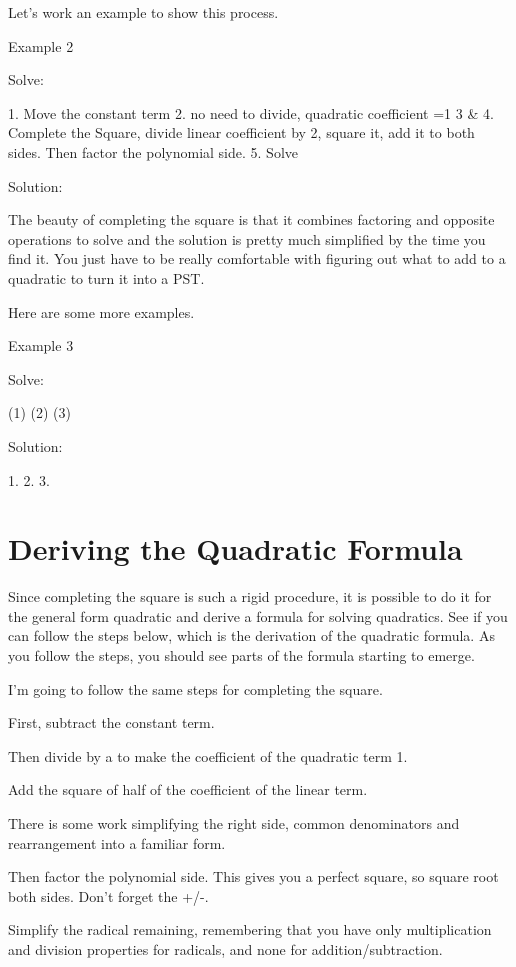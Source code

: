Let's work an example to show this process. 

Example 2

Solve: 

1. Move the constant term
2. no need to divide, quadratic coefficient =1
3 \& 4. Complete the Square, divide linear coefficient by 2, square it, add it to both sides. Then factor the polynomial side.
5. Solve

Solution:


The beauty of completing the square is that it combines factoring and opposite operations to solve and the solution is pretty much simplified by the time you find it. You just have to be really comfortable with figuring out what to add to a quadratic to turn it into a PST.

Here are some more examples.

Example 3

Solve: 

(1) 	(2) 	 (3) 


Solution:

1.
2.
3.

\section{Deriving the Quadratic Formula}

Since completing the square is such a rigid procedure, it is possible to do it for the general form quadratic and derive a formula for solving quadratics. See if you can follow the steps below, which is the derivation of the quadratic formula. As you follow the steps, you should see parts of the formula starting to emerge.


I'm going to follow the same steps for completing the square. 

First, subtract the constant term. 

Then divide by a to make the coefficient of the quadratic term 1.

Add the square of half of the coefficient of the linear term.

There is some work simplifying the right side, common denominators and rearrangement into a familiar form.

Then factor the polynomial side. This gives you a perfect square, so square root both sides. Don't forget the +/-.

Simplify the radical remaining, remembering that you have only multiplication and division properties for radicals, and none for addition/subtraction.

